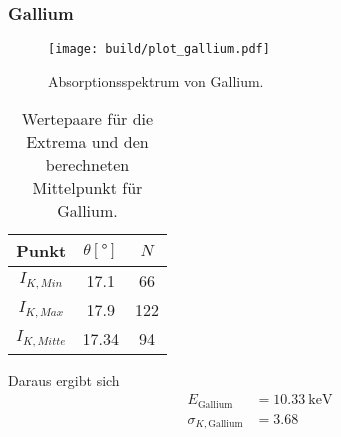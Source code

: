 \clearpage
\subsubsection*{Gallium}
\begin{figure}[H]
    \centering
    \texttt{[image: build/plot\_gallium.pdf]}
    \caption{Absorptionsspektrum von Gallium.}
    \label{fig:gallium}
\end{figure}
\begin{table}[H]                                                                                   
    \centering                                                                                     
        \caption{Wertepaare für die Extrema und den berechneten Mittelpunkt für Gallium.}                      
        \label{tab:Ga}                                                                        
        \begin{tabular}{S S[table-format=2.2] S}                                                   
          \toprule                                                                                 
          {Punkt} & {$\theta [\si{\degree}]$} & {$N$}\\                                            
          \midrule                                                                                 
          {$I_{K,Min  }$} &17.1&66\\
          {$I_{K,Max  }$} &17.9&122\\
          {$I_{K,Mitte}$} &17.34&94\\
          \bottomrule                                                                              
        \end{tabular}                                                                              
      \end{table}                                                                                  
Daraus ergibt sich                                                                                 
\begin{align*}                                                                                     
    E_\text{Gallium} &= \SI{10.33}{\kilo\electronvolt}\\                  
    \sigma_{K, \text{Gallium}} &= \num{3.68}                      
\end{align*}                                                                                       


